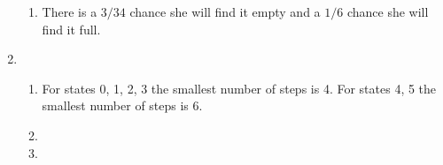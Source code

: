 \documentclass{article}
\begin{document}
\begin{enumerate}
\begin{enumerate}
			\item There is a $3/34$ chance she will find it empty and a $1/6$ chance she will find it full.
		\end{enumerate}
	\item %
		\begin{enumerate}
			\item For states 0, 1, 2, 3 the smallest number of steps is 4. For states 4, 5 the smallest number of steps is 6.
			\item
			\item
		\end{enumerate}
\end{enumerate}
\end{document}
